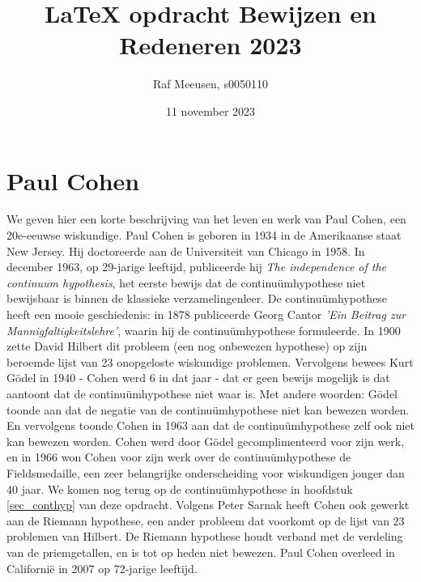 \documentclass[hidelinks,11pt,a4paper]{article}
\title{LaTeX opdracht Bewijzen en Redeneren 2023}
\author{Raf Meeusen, s0050110}
\date{11 november 2023}
\begin{document}
\maketitle

\section{Paul Cohen}
We geven hier een korte beschrijving van het leven en werk van Paul Cohen, een 20e-eeuwse wiskundige. 
Paul Cohen is geboren in 1934 in de Amerikaanse staat New Jersey.  
Hij doctoreerde aan de Universiteit van Chicago in 1958. 
In december 1963, op 29-jarige leeftijd, publiceerde hij \emph{The independence of the continuum hypothesis}, 
het eerste bewijs dat de continu\"um\-hypothese niet bewijsbaar is binnen de klassieke verzamelingenleer. 
De continu\"um\-hypothese heeft een mooie geschiedenis: in 1878 publiceerde Georg Cantor \emph{'Ein Beitrag zur Mannigfaltigkeitslehre'}, waarin hij de continu\"um\-hypothese formuleerde. In 1900 zette David Hilbert dit probleem (een nog onbewezen hypothese) op zijn beroemde lijst van 23 onopgeloste wiskundige problemen. Vervolgens bewees Kurt G\"odel in 1940 - Cohen werd 6 in dat jaar - dat er geen bewijs mogelijk is dat aantoont dat de continu\"um\-hypothese niet waar is. Met andere woorden: G\"odel toonde aan dat de negatie van de continu\"um\-hypothese niet kan bewezen worden. En vervolgens toonde Cohen in 1963 aan dat de continu\"um\-hypothese zelf ook niet kan bewezen worden. 
Cohen werd door G\"odel gecomplimenteerd voor zijn werk, en in 1966 won Cohen voor zijn werk over de continu\"um\-hypothese de Fieldsmedaille, een zeer belangrijke onderscheiding voor wiskundigen jonger dan 40 jaar. 
We komen nog terug op de continu\"um\-hypothese  in hoofdstuk \ref{sec_conthyp} van deze opdracht. 
Volgens Peter Sarnak heeft Cohen ook gewerkt aan de Riemann hypothese, een ander probleem dat voorkomt op de lijst van 23 problemen van Hilbert. De Riemann hypothese houdt verband met de verdeling van de priemgetallen, en is tot op heden niet bewezen. 
Paul Cohen overleed in Californi\"e in 2007 op 72-jarige leeftijd. 
\end{document}
